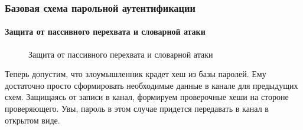 \begin{frame}
\frametitle{Базовая схема парольной аутентификации}
\framesubtitle{Защита от пассивного перехвата и словарной атаки}
\begin{figure}
    \begin{center}
    \end{center}
    \caption{Защита от пассивного перехвата и словарной атаки}\label{pict:pwdhashbasedict}
\end{figure} 
\end{frame}


Теперь допустим, что злоумышленник крадет хеш из базы паролей. Ему достаточно просто сформировать необходимые данные в канале для предыдущих схем. Защищаясь от записи в канал, формируем проверочные хеши на стороне проверяющего. Увы, пароль в этом случае придется передавать в канал в открытом виде.


